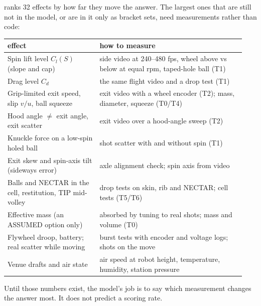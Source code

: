  ranks 32 effects by how far they move the answer. The largest ones
that are still not in the model, or are in it only as bracket sets, need measurements rather than code:
\begin{center}
\begin{tabular}{@{}p{0.36\linewidth}p{0.58\linewidth}@{}}
  \toprule
  effect & how to measure \\
  \midrule
  Spin lift level $C_l(S)$ (slope and cap) & side video at 240--480 fps, wheel above vs below at equal rpm, taped-hole ball (T1) \\
  Drag level $C_d$ & the same flight video and a drop test (T1) \\
  Grip-limited exit speed, slip $v/u$, ball squeeze & exit video with a wheel encoder (T2); mass, diameter, squeeze (T0/T4) \\
  Hood angle $\ne$ exit angle, exit scatter & exit video over a hood-angle sweep (T2) \\
  Knuckle force on a low-spin holed ball & shot scatter with and without spin (T1) \\
  Exit skew and spin-axis tilt (sideways error) & axle alignment check; spin axis from video \\
  Balls and NECTAR in the cell, restitution, TIP mid-volley & drop tests on skin, rib and NECTAR; cell tests (T5/T6) \\
  Effective mass (an ASSUMED option only) & absorbed by tuning to real shots; mass and volume (T0) \\
  Flywheel droop, battery; real scatter while moving & burst tests with encoder and voltage logs; shots on the move \\
  Venue drafts and air state & air speed at robot height, temperature, humidity, station pressure \\
  \bottomrule
\end{tabular}
\end{center}
Until those numbers exist, the model's job is to say which measurement changes the answer most. It
does not predict a scoring rate.
